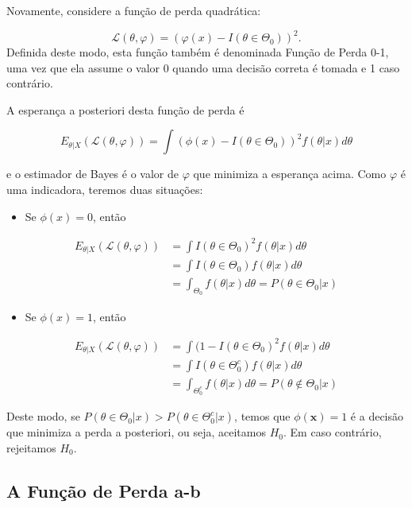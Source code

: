 \documentclass[
  letterpaper,
  DIV=11,
  numbers=noendperiod]{scrreprt}
\providecommand{\tightlist}{%
  \setlength{\itemsep}{0pt}\setlength{\parskip}{0pt}}\usepackage{longtable,booktabs,array}
\theoremstyle{definition}
\theoremstyle{plain}
\theoremstyle{definition}
\theoremstyle{remark}
\begin{document}
Novamente, considere a função de perda quadrática:

\[ \mathcal{L}(\theta,\varphi)=(\varphi(x)-I(\theta\in\Theta_0))^2.\]
Definida deste modo, esta função também é denominada Função de Perda
0-1, uma vez que ela assume o valor 0 quando uma decisão correta é
tomada e 1 caso contrário.

A esperança a posteriori desta função de perda é

\[E_{\theta|X}(\mathcal{L}(\theta,\varphi))=\int \left(\phi(x)- I(\theta\in\Theta_0)\right)^2 f(\theta|x)d\theta\]

e o estimador de Bayes é o valor de \(\varphi\) que minimiza a esperança
acima. Como \(\varphi\) é uma indicadora, teremos duas situações:

\begin{itemize}
\tightlist
\item
  Se \(\phi(x)=0\), então
\end{itemize}

\[\begin{align}E_{\theta|X}(\mathcal{L}(\theta,\varphi))&=\int I(\theta\in\Theta_0)^2 f(\theta|x)d\theta\\&=\int I(\theta\in\Theta_0) f(\theta|x)d\theta\\&=\int_{\Theta_0 }f(\theta|x)d\theta=P(\theta\in\Theta_0|x)\end{align}\]

\begin{itemize}
\tightlist
\item
  Se \(\phi(x)=1\), então
\end{itemize}

\[\begin{align}E_{\theta|X}(\mathcal{L}(\theta,\varphi))&=\int (1-I(\theta\in\Theta_0)^2 f(\theta|x)d\theta\\&=\int I(\theta\in\Theta_0^c) f(\theta|x)d\theta\\&=\int_{\Theta_0^c }f(\theta|x)d\theta=P(\theta\notin\Theta_0|x)\end{align}\]

Deste modo, se \(P(\theta\in\Theta_0|x)>P(\theta\in\Theta_0^c|x)\),
temos que \(\phi(\boldsymbol{x})=1\) é a decisão que minimiza a perda a
posteriori, ou seja, aceitamos \(H_0\). Em caso contrário, rejeitamos
\(H_0\).

\subsection{A Função de Perda a-b}\label{a-funuxe7uxe3o-de-perda-a-b}
\end{document}
